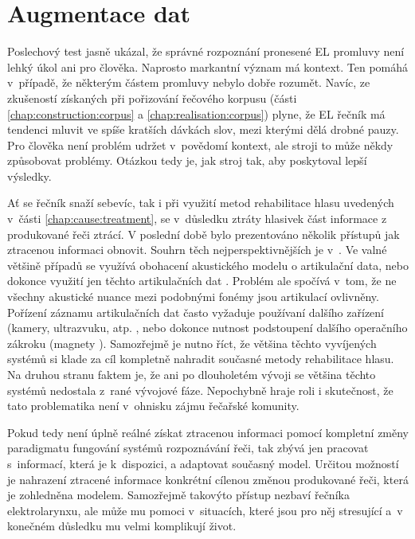 \section{Augmentace dat}
\label{chap:realisation:augmentation}

Poslechový test jasně ukázal, že správné rozpoznání pronesené EL promluvy není lehký úkol ani pro člověka.
Naprosto markantní význam má kontext.
Ten pomáhá v~případě, že některým částem promluvy nebylo dobře rozumět.
Navíc, ze zkušeností získaných při pořizování řečového korpusu (části \ref{chap:construction:corpus} a \ref{chap:realisation:corpus}) plyne, že EL řečník má tendenci mluvit ve spíše kratších dávkách slov, mezi kterými dělá drobné pauzy.
Pro člověka není problém udržet v~povědomí kontext, ale stroji to může někdy způsobovat problémy.
Otázkou tedy je, jak  stroj tak, aby poskytoval lepší výsledky.

Ať se řečník snaží sebevíc, tak i při využití metod rehabilitace hlasu uvedených v~části \ref{chap:cause:treatment}, se v~důsledku ztráty hlasivek část informace z produkované řeči ztrácí.
V poslední době bylo prezentováno několik přístupů jak ztracenou informaci obnovit.
Souhrn těch nejperspektivnějších je v~\cite{Denby2010}.
Ve valné většině případů se využívá obohacení akustického modelu o artikulační data, nebo dokonce využití jen těchto artikulačních dat \cite{Hofe2013} .
Problém ale spočívá v~tom, že ne všechny akustické nuance mezi podobnými fonémy jsou artikulací ovlivněny.
Pořízení záznamu artikulačních dat často vyžaduje používaní dalšího zařízení (kamery, ultrazvuku, atp. \cite{Hueber2010, Fagan2008, Jorgensen2010, Hirahara2010},
nebo dokonce nutnost podstoupení dalšího operačního zákroku (magnety \cite{Hofe2011}).
Samozřejmě je nutno říct, že většina těchto vyvíjených systémů si klade za cíl kompletně nahradit současné metody rehabilitace hlasu.
Na druhou stranu faktem je, že ani po dlouholetém vývoji se většina těchto systémů nedostala z~rané vývojové fáze.
Nepochybně hraje roli i skutečnost, že tato problematika není v~ohnisku zájmu řečařské komunity.

Pokud tedy není úplně reálné získat ztracenou informaci pomocí kompletní změny paradigmatu fungování systémů rozpoznávání řeči, tak zbývá jen pracovat s~informací, která je  k~dispozici, a adaptovat současný model.
Určitou možností je nahrazení ztracené informace konkrétní cílenou změnou produkované řeči,
která je zohledněna modelem.
Samozřejmě takovýto přístup nezbaví řečníka elektrolarynxu, ale může mu pomoci v~situacích, které jsou pro něj stresující a~v konečném důsledku mu velmi komplikují život.

